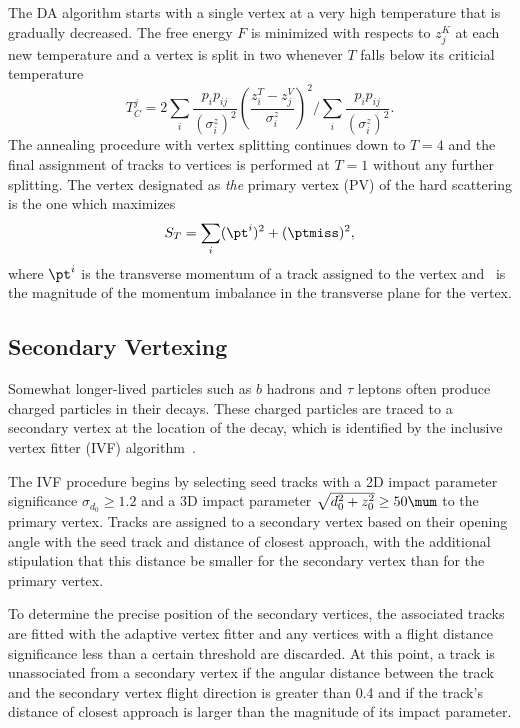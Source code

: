 The DA algorithm starts with a single vertex at a very high temperature that is gradually decreased.
The free energy $F$ is minimized with respects to $z_j^K$ at each new temperature and a vertex is split in two whenever $T$ falls below its criticial temperature
\begin{equation}
  T_C^j = 2 \sum_i \frac{p_i p_{ij}}{\left(\sigma_i^z\right)^2} \left(\frac{z_i^T - z_j^V}{\sigma^z_i}\right)^2 \Bigg/ \sum_i \frac{p_i p_{ij}}{\left(\sigma_i^z\right)^2}.
\end{equation}
The annealing procedure with vertex splitting continues down to $T = 4$ and the final assignment of tracks to vertices is performed at $T = 1$ without any further splitting. 
The vertex designated as \textit{the} primary vertex (PV) of the hard scattering is the one which maximizes
\begin{equation}
  S_T = \sum_i  (\pt^i)^2 + (\ptmiss)^2,
  \end{equation}
where $\pt^i$ is the transverse momentum of a track assigned to the vertex and \ptmiss\ is the magnitude of the momentum imbalance in the transverse plane for the vertex. 

\subsection{Secondary Vertexing}
\label{sec:pf_csv}

Somewhat longer-lived particles such as $b$ hadrons and $\tau$ leptons often produce charged particles in their decays.
These charged particles are traced to a secondary vertex at the location of the decay, which is identified by the inclusive vertex fitter (IVF) algorithm~\cite{Vertex2018}.

The IVF procedure begins by selecting seed tracks with a 2D impact parameter significance $\sigma_{d_0} \ge 1.2$ and a 3D impact parameter $\sqrt{d_0^2 + z_0^2} \ge  50\mum$ to the primary vertex.
Tracks are assigned to a secondary vertex based on their opening angle with the seed track and distance of closest approach, with the additional stipulation that this distance be smaller for the secondary vertex than for the primary vertex.

To determine the precise position of the secondary vertices, the associated tracks are fitted with the adaptive vertex fitter and any vertices with a flight distance significance less than a certain threshold are discarded.
At this point, a track is unassociated from a secondary vertex if the angular distance between the track and the secondary vertex flight direction is greater than 0.4 and if the track's distance of closest approach is larger than the magnitude of its impact parameter.

